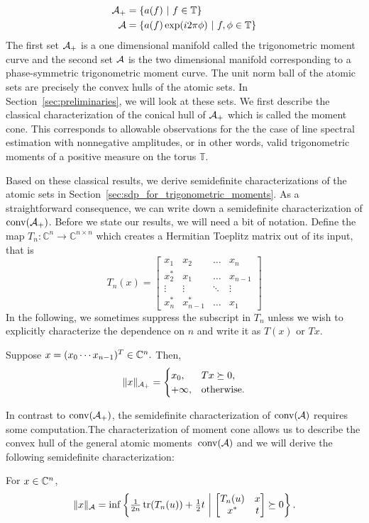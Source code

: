 \begin{align}
\mathcal{A}_+ &= \left\{ a(f) ~\middle|~ f \in \mathbb{T} \right\}\\
\mathcal{A}   &= \left\{ a(f) \exp(i 2\pi \phi) ~\middle|~ f, \phi \in \mathbb{T} \right\}
\end{align}
The first set $\mathcal{A}_+$ is a one dimensional manifold called the trigonometric
moment curve and the second set $\mathcal{A}$ is the two dimensional manifold
corresponding to a phase-symmetric trigonometric moment curve. The unit norm
ball of the atomic sets are precisely the convex hulls of the atomic sets. In
Section~\ref{sec:preliminaries}, we will look at these sets. We first describe
the classical characterization of the conical hull of $\mathcal{A}_+$ which is called the moment cone. This corresponds to allowable observations for the the case of line
spectral estimation with nonnegative amplitudes, or in other words, valid
trigonometric moments of a positive measure on the torus $\mathbb{T}$.

Based on these classical results, we derive semidefinite characterizations of
the atomic sets in Section~\ref{sec:sdp_for_trigonometric_moments}. As a
straightforward consequence, we can write down a semidefinite characterization
of $\operatorname{conv}(\mathcal{A}_+)$. Before we state our results, we will need a bit of notation.
Define the map $T_n:\mathbb{C}^n \rightarrow \mathbb{C}^{n\times n}$ which
creates a Hermitian Toeplitz matrix out of its input, that is
\[
T_n(x)= \left[
\begin{array}{ccccc} x_1 & x_2 & \ldots & x_n\\ 
x^*_2 & x_1  & \ldots & x_{n-1}\\
 \vdots & \vdots & \ddots & \vdots\\
 x^*_n & x^*_{n-1}  & \ldots & x_1
 \end{array}\right]
\]
In the following, we sometimes suppress the subscript in $T_n$ unless we wish to explicitly characterize the dependence on $n$ and write it as $T(x)$ or $T x$. 
\begin{theorem}
\label{thm:positive-linespect-sdp}
Suppose $x = (x_0 \cdots x_{n-1})^T \in \mathbb{C}^n.$ Then, 
	\[
		\lVert x\rVert_{\mathcal{A}_{+}} = \begin{cases}
			x_0, & T x \succeq 0,\\
			+\infty, & \text{otherwise.}
		\end{cases}
	\]
\end{theorem}
In contrast to $\operatorname{conv}(\mathcal{A}_+)$, the semidefinite characterization of $\operatorname{conv}(\mathcal{A})$
requires some computation.The characterization of moment cone allows us to
describe the convex hull of the general atomic moments~$\operatorname{conv}(\mathcal{A})$ and we will
derive the following semidefinite characterization:
\begin{theorem}\label{thm:sdp-char}
	For $x\in \mathbb{C}^n$,
	\begin{equation}
	\label{eq:atomic_sdp}
	\|x\|_{\mathcal{A}} = \inf\left\{ \tfrac{1}{2n} \operatorname{tr}( T_n(u)) +\tfrac{1}{2} t ~\middle|~ \begin{bmatrix}
T_n(u) & x\\
x^* & t
\end{bmatrix} \succeq 0 \right\}.
	\end{equation}
\end{theorem}


